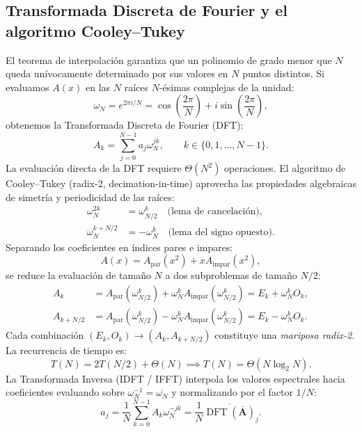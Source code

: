 \subsection{Transformada Discreta de Fourier y el algoritmo Cooley--Tukey}
El teorema de interpolación garantiza que un polinomio de grado menor que $N$ queda unívocamente determinado por sus valores en $N$ puntos distintos. Si evaluamos $A(x)$ en las $N$ raíces $N$-ésimas complejas de la unidad:
\begin{equation}
\omega_N = e^{2\pi i / N} = \cos\left(\frac{2\pi}{N}\right) + i\sin\left(\frac{2\pi}{N}\right),
\end{equation}
obtenemos la Transformada Discreta de Fourier (DFT):
\begin{equation}
A_k = \sum_{j=0}^{N-1} a_j \omega_N^{j k}, \qquad k \in \{0, 1, \dots, N-1\}.
\end{equation}
La evaluación directa de la DFT requiere $\Theta(N^2)$ operaciones. El algoritmo de Cooley--Tukey (radix-2, decimation-in-time) aprovecha las propiedades algebraicas de simetría y periodicidad de las raíces:
\begin{align}
\omega_N^{2k} &= \omega_{N/2}^k \quad \text{(lema de cancelación)}, \\
\omega_N^{k + N/2} &= -\omega_N^k \quad \text{(lema del signo opuesto)}.
\end{align}
Separando los coeficientes en índices pares e impares:
\begin{equation}
A(x) = A_{\text{par}}(x^2) + x A_{\text{impar}}(x^2),
\end{equation}
se reduce la evaluación de tamaño $N$ a dos subproblemas de tamaño $N/2$:
\begin{align}
A_k &= A_{\text{par}}(\omega_{N/2}^k) + \omega_N^k A_{\text{impar}}(\omega_{N/2}^k) = E_k + \omega_N^k O_k, \\
A_{k+N/2} &= A_{\text{par}}(\omega_{N/2}^k) - \omega_N^k A_{\text{impar}}(\omega_{N/2}^k) = E_k - \omega_N^k O_k.
\end{align}
Cada combinación $(E_k, O_k) \to (A_k, A_{k+N/2})$ constituye una \emph{mariposa radix-2}. La recurrencia de tiempo es:
\begin{equation}
T(N) = 2T(N/2) + \Theta(N) \implies T(N) = \Theta(N \log_2 N).
\end{equation}
La Transformada Inversa (IDFT / IFFT) interpola los valores espectrales hacia coeficientes evaluando sobre $\omega_N^{-1} = \overline{\omega_N}$ y normalizando por el factor $1/N$:
\begin{equation}
a_j = \frac{1}{N} \sum_{k=0}^{N-1} A_k \omega_N^{-j k} = \frac{1}{N} \overline{\operatorname{DFT}(\overline{\mathbf{A}})}_j.
\end{equation}


